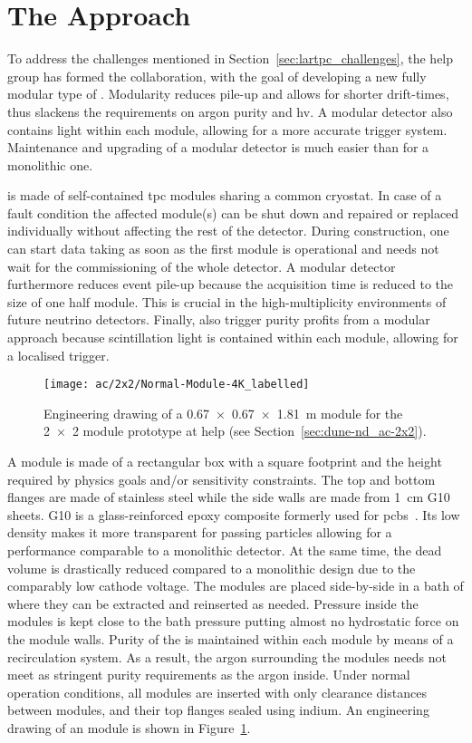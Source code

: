 \section{The \AC{} Approach}
\label{sec:ac_argoncube}

To address the challenges mentioned in Section~\ref{sec:lartpc_challenges}, the \gls{help} group has formed the \AC{} collaboration, with the goal of developing a new fully modular type of \lartpc{}.
Modularity reduces pile-up and allows for shorter drift-times, thus slackens the requirements on argon purity and \gls{hv}.
A modular detector also contains light within each module, allowing for a more accurate trigger system.
Maintenance and upgrading of a modular detector is much easier than for a monolithic one.

\AC{} is made of self-contained \gls{tpc} modules sharing a common cryostat.
In case of a fault condition the affected module(s) can be shut down and repaired or replaced individually without affecting the rest of the detector.
During construction, one can start data taking as soon as the first module is operational and needs not wait for the commissioning of the whole detector.
A modular detector furthermore reduces event pile-up because the acquisition time is reduced to the size of one half module.
This is crucial in the high-multiplicity environments of future \lar{} neutrino detectors.
Finally, also trigger purity profits from a modular approach because scintillation light is contained within each module, allowing for a localised trigger.

\begin{figure}[htb]
	\centering
	\texttt{[image: ac/2x2/Normal-Module-4K\_labelled]}
	\caption[\AC{} module engineering drawing]{%
		Engineering drawing of a \SI{0.67 x 0.67 x 1.81}{\metre} \AC{} module for the \num{2 x 2} module prototype at \acrshort{help} (see Section~\ref{sec:dune-nd_ac-2x2}).
	}
	\label{fig:ac_module}
\end{figure}

A module is made of a rectangular box with a square footprint and the height required by physics goals and/or sensitivity constraints.
The top and bottom flanges are made of stainless steel while the side walls are made from \SI{1}{\centi\metre} G10 sheets.
G10 is a glass-reinforced epoxy composite formerly used for \glspl{pcb}~\cite{g10}.
Its low density makes it more transparent for passing particles allowing for a performance comparable to a monolithic detector.
At the same time, the dead volume is drastically reduced compared to a monolithic design due to the comparably low cathode voltage.
The modules are placed side-by-side in a bath of \lar{} where they can be extracted and reinserted as needed.
Pressure inside the modules is kept close to the bath pressure putting almost no hydrostatic force on the module walls.
Purity of the \lar{} is maintained within each module by means of a recirculation system.
As a result, the argon surrounding the modules needs not meet as stringent purity requirements as the argon inside.
Under normal operation conditions, all modules are inserted with only clearance distances between modules, and their top flanges sealed using indium.
An engineering drawing of an \AC{} module is shown in Figure~\ref{fig:ac_module}.

